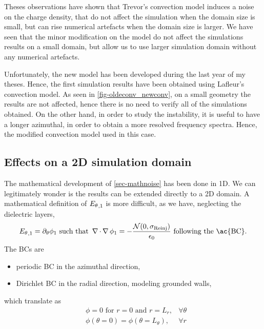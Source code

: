       Theses observations have shown that Trevor's convection model induces a noise on the charge density, that do not affect the simulation when the domain size is small, but can rise numerical artefacts when the domain size is larger.
      We have seen that the minor modification on the model do not affect the simulations results on a small domain, but allow us to use larger simulation domain without any numerical artefacts.
      
      Unfortunately, the new model has been developed during the last year of my theses.
      Hence, the first simulation results have been obtained using Lafleur's convection model.
      As seen in \cref{fig-oldeconv_newconv}, on a small geometry the results are not affected, hence there is no need to verify all of the simulations obtained.
      On the other hand, in order to study the instability, it is useful to have a longer azimuthal, in order to obtain a more resolved frequency spectra.
      Hence, the modified convection model  used in this case.
          
    \subsection{Effects on a \ac{2D} simulation domain}
      
      The mathematical development of \cref{sec-mathnoise} has been done in \ac{1D}.
      We can legitimately wonder is the results  can be extended directly to a \ac{2D} domain.
      A mathematical definition of ${E_{\theta}}_{, 1}$ is more difficult, as we have, neglecting the dielectric layers,
      \begin{equation} \label{eq-aziE}
        \aziE_{, 1} = \partial_{\theta} \phi_1 \text{ such that } \grad \cdot \grad \phi_1 = - \frac { \N(0, \stdconv)}{\epsilon_0} \text{ following the \ac{BC}}.
      \end{equation}
      The \ac{BC}s are
      \begin{itemize}
        \item periodic \ac{BC} in the azimuthal direction,
        \item Dirichlet \ac{BC} in the radial direction, modeling grounded walls,
      \end{itemize}
      which translate as
      \begin{align}
        &\phi = 0 \text{ for } r=0 \text{ and } r=L_r, &\forall \theta \label{eq-BC1} \\
        &\phi(\theta = 0)= \phi(\theta = L_{\theta}) , &\forall r \label{eq-BC2}
      \end{align}
      
